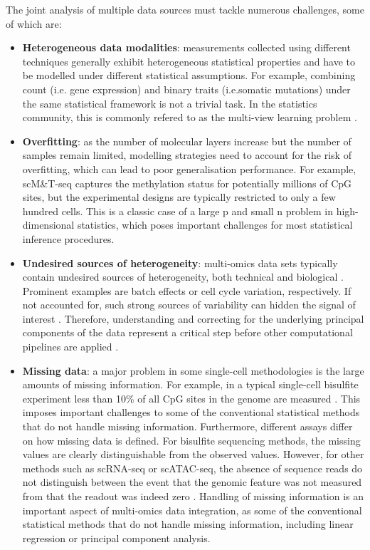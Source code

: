 The joint analysis of multiple data sources must tackle numerous challenges, some of which are:

\begin{itemize}
	\item \textbf{Heterogeneous data modalities}: measurements collected using different techniques generally exhibit heterogeneous statistical properties and have to be modelled under different statistical assumptions. For example, combining count (i.e. gene expression) and binary traits (i.e.somatic mutations) under the same statistical framework is not a trivial task. In the statistics community, this is commonly refered to as the multi-view learning problem \cite{Xu2013,Li2016}.

	\item \textbf{Overfitting}: as the number of molecular layers increase but the number of samples remain limited, modelling strategies need to account for the risk of overfitting, which can lead to poor generalisation performance. For example, scM\&T-seq captures the methylation status for potentially millions of CpG sites, but the experimental designs are typically restricted to only a few hundred cells. This is a classic case of a large p and small n problem in high-dimensional statistics, which poses important challenges for most statistical inference procedures.

	\item \textbf{Undesired sources of heterogeneity}: multi-omics data sets typically contain undesired sources of heterogeneity, both technical and biological \cite{Ritchie2015}. Prominent examples are batch effects or cell cycle variation, respectively. If not accounted for, such strong sources of variability can hidden the signal of interest \cite{Buettner2015}. Therefore, understanding and correcting for the underlying principal components of the data represent a critical step before other computational pipelines are applied \cite{Meng2016}.

	\item \textbf{Missing data}: a major problem in some single-cell methodologies is the large amounts of missing information. For example, in a typical single-cell bisulfite experiment less than 10\% of all CpG sites in the genome are measured \cite{Smallwood2014}. This imposes important challenges to some of the conventional statistical methods that do not handle missing information. Furthermore, different assays differ on how missing data is defined. For bisulfite sequencing methods, the missing values are clearly distinguishable from the observed values. However, for other methods such as scRNA-seq or scATAC-seq, the absence of sequence reads do not distinguish between the event that the genomic feature was not measured from that the readout was indeed zero \cite{Clark2018}. Handling of missing information is an important aspect of multi-omics data integration, as some of the conventional statistical methods that do not handle missing information, including linear regression or principal component analysis.


\end{itemize}
